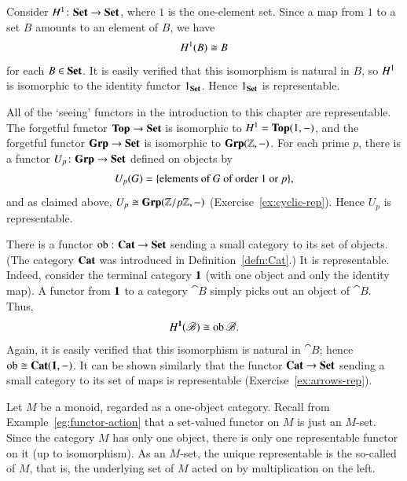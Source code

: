 \begin{example}
\label{eg:co-reps-id-Set}
Consider $\h^1\from \Set \to \Set$, where $1$ is the one-element set.
Since a map from $1$ to a set $B$ amounts to an element of $B$, we have
\[
H^1(B) \cong B
\]
for each $B \in \mathbf{Set}$.  It is easily verified that this isomorphism is
natural in $B$, so $H^1$ is isomorphic to the identity functor $1_{\mathbf{Set}}$.
Hence $1_{\mathbf{Set}}$ is representable.
\end{example}

\begin{example}
\label{eg:co-reps-seeing}
All of the `seeing'%
%
%
functors in the introduction to this chapter are representable.  The
forgetful%
%
%
functor $\mathbf{Top} \to \mathbf{Set}$ is isomorphic to $H^1 = \mathbf{Top}(1, -)$, and the
forgetful functor $\mathbf{Grp} \to \mathbf{Set}$ is isomorphic to $\mathbf{Grp}(\mathbb{Z},
-)$.  For each prime $p$, there is a functor $U_p\from \Grp \to \Set$
defined on objects by
\[
U_p(G) =
\{\text{elements of }G \text{ of order } 1 \text{ or } p \},
%
\index{group!order of element of}
%
\]
and as claimed above, $U_p \cong \mathbf{Grp}(\mathbb{Z}/p\mathbb{Z}, -)$
(Exercise~\ref{ex:cyclic-rep}).  Hence $U_p$ is representable.
\end{example}

\begin{example}
There is a functor $\ob\from \Cat \to \Set$ sending a small category to its
set%
%
%
of objects.  (The category $\mathbf{Cat}$ was introduced in
Definition~\ref{defn:Cat}.) It is representable.  Indeed, consider the
terminal category $\mathbf{1}$ (with one object and only the identity map).  A
functor from $\mathbf{1}$ to a category $\cat{B}$ simply picks out an object of
$\cat{B}$.  Thus,
\[
H^{\mathbf{1}}(\mathscr{B}) \cong \operatorname{ob}\mathscr{B}.
\]
Again, it is easily verified that this isomorphism is natural in $\cat{B}$;
hence $\operatorname{ob} \cong \mathbf{Cat}(\mathbf{1}, -)$.  It can be shown similarly that the
functor $\mathbf{Cat} \to \mathbf{Set}$ sending a small category to its set of maps is
representable (Exercise~\ref{ex:arrows-rep}).
\end{example}

\begin{example}
Let $M$ be a monoid, regarded as a one-object%
%
%
category.  Recall from Example~\ref{eg:functor-action} that a set-valued
functor on $M$ is just an $M$-set.  Since the category $M$ has only one
object, there is only one representable functor on it (up to isomorphism).
As an $M$-set, the unique representable is the so-called  of $M$, that is, the underlying set of $M$ acted on by
multiplication on the left.
\end{example}

